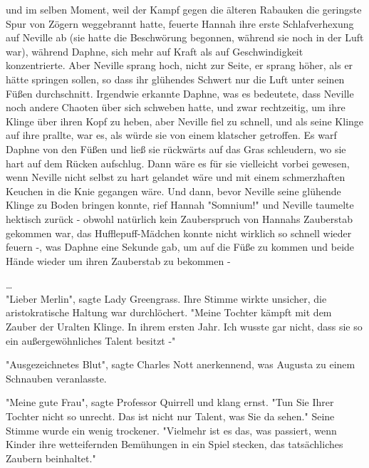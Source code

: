 {und im selben Moment, weil der Kampf gegen die älteren Rabauken die geringste Spur von Zögern weggebrannt hatte, feuerte Hannah ihre erste Schlafverhexung auf Neville ab (sie hatte die Beschwörung begonnen, während sie noch in der Luft war), während Daphne, sich mehr auf Kraft als auf Geschwindigkeit konzentrierte. Aber Neville sprang hoch, nicht zur Seite, er sprang höher, als er hätte springen sollen, so dass ihr glühendes Schwert nur die Luft unter seinen Füßen durchschnitt. Irgendwie erkannte Daphne, was es bedeutete, dass Neville noch andere Chaoten über sich schweben hatte, und zwar rechtzeitig, um ihre Klinge über ihren Kopf zu heben, aber Neville fiel zu schnell, und als seine Klinge auf ihre prallte, war es, als würde sie von einem klatscher getroffen. Es warf Daphne von den Füßen und ließ sie rückwärts auf das Gras schleudern, wo sie hart auf dem Rücken aufschlug. Dann wäre es für sie vielleicht vorbei gewesen, wenn Neville nicht selbst zu hart gelandet wäre und mit einem schmerzhaften Keuchen in die Knie gegangen wäre. Und dann, bevor Neville seine glühende Klinge zu Boden bringen konnte, rief Hannah "Somnium!" und Neville taumelte hektisch zurück - obwohl natürlich kein Zauberspruch von Hannahs Zauberstab gekommen war, das Hufflepuff-Mädchen konnte nicht wirklich so schnell wieder feuern -, was Daphne eine Sekunde gab, um auf die Füße zu kommen und beide Hände wieder um ihren Zauberstab zu bekommen -

…\\ "Lieber Merlin", sagte Lady Greengrass. Ihre Stimme wirkte unsicher, die aristokratische Haltung war durchlöchert. "Meine Tochter kämpft mit dem Zauber der Uralten Klinge. In ihrem ersten Jahr. Ich wusste gar nicht, dass sie so ein außergewöhnliches Talent besitzt -"

"Ausgezeichnetes Blut", sagte Charles Nott anerkennend, was Augusta zu einem Schnauben veranlasste.

"Meine gute Frau", sagte Professor Quirrell und klang ernst. "Tun Sie Ihrer Tochter nicht so unrecht. Das ist nicht nur Talent, was Sie da sehen." Seine Stimme wurde ein wenig trockener. "Vielmehr ist es das, was passiert, wenn Kinder ihre wetteifernden Bemühungen in ein Spiel stecken, das tatsächliches Zaubern beinhaltet."

}
